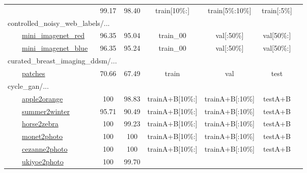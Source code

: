 \documentclass{article} \usepackage{iclr2023_conference,times}
\begin{document}
\begin{table*}[h]
\begin{tabular}{lcccccc}
&  99.17  &  98.40
 & train[{\tiny10\%:}] & train[{\tiny5\%:10\%}] & train[{\tiny:5\%}] &
 \citep{Kather2016MulticlassTA}
 \\
\multicolumn{2}{l}{
controlled\_noisy\_web\_labels/...
}
 &
 \\
\ \ \ \ \href{https://www.tensorflow.org/datasets/catalog/controlled_noisy_web_labels#mini_imagenet_red}{mini\_imagenet\_red}
&  96.35  &  95.04
 & train\_00 & val[{\tiny:50\%}] & val[{\tiny50\%:}] & 
 \citep{Jiang2020BeyondSN}
 \\
\ \ \ \ \href{https://www.tensorflow.org/datasets/catalog/controlled_noisy_web_labels#mini_imagenet_blue}{mini\_imagenet\_blue}
&  96.35  &  95.24
 & train\_00 & val[{\tiny:50\%}] & val[{\tiny50\%:}] &  \citep{Jiang2020BeyondSN}
 \\
\multicolumn{2}{l}{
curated\_breast\_imaging\_ddsm/...
}
 &
 \\
\ \ \ \ \href{https://www.tensorflow.org/datasets/catalog/curated_breast_imaging_ddsm#patches}{patches}
&  70.66  &  67.49
 & train & val & test & 
 \citep{Clark2013TheCI}
 \\
cycle\_gan/...
&
 \\
\ \ \ \ \href{https://www.tensorflow.org/datasets/catalog/cycle_gan#apple2orange}{apple2orange}
 &  100  &  98.83
 &  {\tiny trainA+B[10\%:]} & {\tiny trainA+B[:10\%]} & {\tiny testA+B}&  
 \citep{Zhu2017UnpairedIT}
 \\
\ \ \ \ \href{https://www.tensorflow.org/datasets/catalog/cycle_gan#summer2winter_yosemite}{summer2winter} & 95.71  &  90.49
 &  {\tiny trainA+B[10\%:]} & {\tiny trainA+B[:10\%]} & {\tiny testA+B}&
 \citep{Zhu2017UnpairedIT}
 \\
\ \ \ \ \href{https://www.tensorflow.org/datasets/catalog/cycle_gan#horse2zebra}{horse2zebra}
&  100  &  99.23
 &  {\tiny trainA+B[10\%:]} & {\tiny trainA+B[:10\%]} & {\tiny testA+B}&
 \citep{Zhu2017UnpairedIT}
 \\
\ \ \ \ \href{https://www.tensorflow.org/datasets/catalog/cycle_gan#monet2photo}{monet2photo}
&  100  &  100
 &  {\tiny trainA+B[10\%:]} & {\tiny trainA+B[:10\%]} & {\tiny testA+B}&
 \citep{Zhu2017UnpairedIT}
 \\
\ \ \ \ \href{https://www.tensorflow.org/datasets/catalog/cycle_gan#cezanne2photo}{cezanne2photo}
&  100  &  100
 &  {\tiny trainA+B[10\%:]} & {\tiny trainA+B[:10\%]} & {\tiny testA+B}&
 \citep{Zhu2017UnpairedIT}
 \\
\ \ \ \ \href{https://www.tensorflow.org/datasets/catalog/cycle_gan#ukiyoe2photo}{ukiyoe2photo}
&  100  &  99.70

\end{tabular}
\end{table*}
\end{document}
